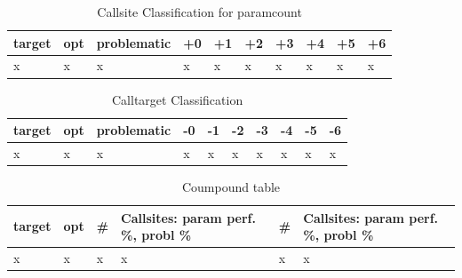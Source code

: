\begin{table}[H]
\centering
\caption{Callsite Classification for paramcount}
\label{Integer overflow bug detection in CWE-190}
\begin{tabular}{|l|l|l|l|l|l|l|l|l|l|} \hline
\textbf{target}  & \textbf{opt}     & \textbf{problematic}    &\textbf{+0} & \textbf{+1}  & \textbf{+2} &\textbf{+3} &\textbf{+4} &\textbf{+5} &\textbf{+6}  \\ \hline 
x                &x                 &x                        &x           &x             &x            &x           &x           &x           &x            \\ \hline

\end{tabular}
\end{table}

\begin{table}[H]
\centering
\caption{Calltarget Classification}
\label{Integer overflow bug detection in CWE-190}
\begin{tabular}{|l|l|l|l|l|l|l|l|l|l|} \hline
\textbf{target}  & \textbf{opt}     & \textbf{problematic}    &\textbf{-0} & \textbf{-1}  & \textbf{-2} &\textbf{-3} &\textbf{-4} &\textbf{-5} &\textbf{-6}  \\ \hline 
x                &x                 &x                        &x           &x             &x            &x           &x           &x           &x            \\ \hline

\end{tabular}
\end{table}

\begin{table}[H]
\centering
\caption{Coumpound table}
\label{Integer overflow bug detection in CWE-190}
\begin{tabular}{|l|l|l|l|l|l|} \hline
\textbf{target}  & \textbf{opt}     & \textbf{\#}    &\textbf{Callsites: param perf. \%, probl \%} & \textbf{\#}  & \textbf{Callsites: param perf. \%, probl \%}  \\ \hline 
x                &x                 &x               &x                                      &x             &x                                        \\ \hline

\end{tabular}
\end{table}


